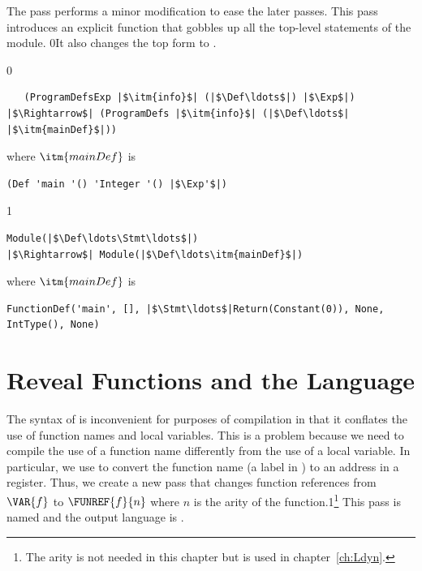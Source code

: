 \documentclass[7x10]{TimesAPriori_MIT}%
\def\racketEd{0}
\def\pythonEd{1}
\def\edition{1}
\newcommand{\racket}[1]{{\if\edition\racketEd{#1}\fi}}
\newcommand{\pythonColor}[0]{}
\newcommand{\python}[1]{{\if\edition\pythonEd\pythonColor #1\fi}}
\numberwithin{theorem}{chapter}
\numberwithin{definition}{chapter}
\numberwithin{equation}{chapter}
\begin{document}
The  pass performs a minor modification to ease the
later passes. This pass introduces an explicit  function
that gobbles up all the top-level statements of the module.
%
\racket{It also changes the top  form to
\code{ProgramDefs}.}

{\if\edition\racketEd  
\begin{lstlisting}
   (ProgramDefsExp |$\itm{info}$| (|$\Def\ldots$|) |$\Exp$|)
|$\Rightarrow$| (ProgramDefs |$\itm{info}$| (|$\Def\ldots$| |$\itm{mainDef}$|))
\end{lstlisting}
where $\itm{mainDef}$ is
\begin{lstlisting}
(Def 'main '() 'Integer '() |$\Exp'$|)
\end{lstlisting}
\fi}
{\if\edition\pythonEd\pythonColor
\begin{lstlisting}
Module(|$\Def\ldots\Stmt\ldots$|)
|$\Rightarrow$| Module(|$\Def\ldots\itm{mainDef}$|)
\end{lstlisting}
where $\itm{mainDef}$ is
\begin{lstlisting}
FunctionDef('main', [], |$\Stmt\ldots$|Return(Constant(0)), None, IntType(), None)
\end{lstlisting}
\fi}

\section{Reveal Functions and the \LangFunRef{} Language}
\label{sec:reveal-functions-r4}

The syntax of \LangFun{} is inconvenient for purposes of compilation
in that it conflates the use of function names and local
variables. This is a problem because we need to compile the use of a
function name differently from the use of a local variable.  In
particular, we use {\ILEA} to convert the function name (a label
in \ArchName) to an address in a register.  Thus, we create a new pass that
changes function references from $\VAR{f}$ to $\FUNREF{f}{n}$ where
$n$ is the arity of the function.\python{\footnote{The arity is not
    needed in this chapter but is used in chapter~\ref{ch:Ldyn}.}}
This pass is named  and the output language
is \LangFunRef{}.

\end{document}

